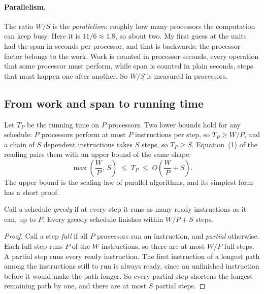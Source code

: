 \paragraph{Parallelism.} The ratio $W/S$ is the \emph{parallelism}: roughly how many processors the computation can keep busy. Here it is $11/6 \approx 1.8$, so about two. My first guess at the units had the span in seconds per processor, and that is backwards: the processor factor belongs to the work. Work is counted in processor-seconds, every operation that some processor must perform, while span is counted in plain seconds, steps that must happen one after another. So $W/S$ is measured in processors.

\subsection{From work and span to running time}

Let $T_P$ be the running time on $P$ processors. Two lower bounds hold for any schedule: $P$ processors perform at most $P$ instructions per step, so $T_P \ge W/P$, and a chain of $S$ dependent instructions takes $S$ steps, so $T_P \ge S$. Equation~(1) of the reading pairs them with an upper bound of the same shape:
\[
  \max\!\left(\frac{W}{P},\, S\right) \;\le\; T_P \;\le\; O\!\left(\frac{W}{P} + S\right).
\]
The upper bound is the scaling law of parallel algorithms, and its simplest form has a short proof.

\begin{theorem}[Brent]
\label{thm:brent}
Call a schedule \emph{greedy} if at every step it runs as many ready instructions as it can, up to $P$. Every greedy schedule finishes within $W/P + S$ steps.
\end{theorem}

\begin{proof}
Call a step \emph{full} if all $P$ processors run an instruction, and \emph{partial} otherwise. Each full step runs $P$ of the $W$ instructions, so there are at most $W/P$ full steps. A partial step runs every ready instruction. The first instruction of a longest path among the instructions still to run is always ready, since an unfinished instruction before it would make the path longer. So every partial step shortens the longest remaining path by one, and there are at most $S$ partial steps.
\end{proof}

